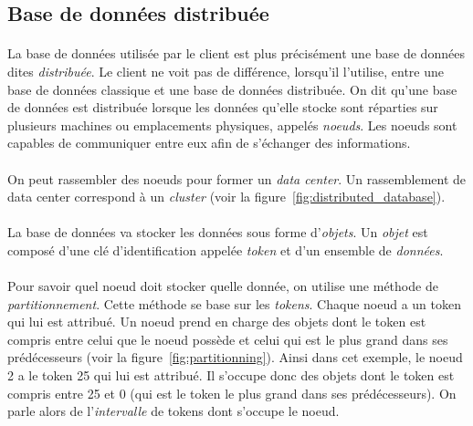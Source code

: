 \documentclass[12pt]{article}
\begin{document}

\subsection{Base de données distribuée}

\paragraph{} La base de données utilisée par le client est plus précisément une base de données dites \textit{distribuée}. Le client ne voit pas de différence, lorsqu'il l'utilise, entre une base de données classique et une base de données distribuée. On dit qu'une base de données est distribuée lorsque les données qu'elle stocke sont réparties sur plusieurs machines ou emplacements physiques, appelés \textit{noeuds}. Les noeuds sont capables de communiquer entre eux afin de s'échanger des informations.

\paragraph{} On peut rassembler des noeuds pour former un \textit{data center}. Un rassemblement de data center correspond à un \textit{cluster} (voir la figure~\ref{fig:distributed_database}).

\paragraph{} La base de données va stocker les données sous forme d'\textit{objets}. Un \textit{objet} est composé d'une clé d'identification appelée \textit{token} et d'un ensemble de \textit{données}.

\paragraph{} Pour savoir quel noeud doit stocker quelle donnée, on utilise une méthode de \textit{partitionnement}. Cette méthode se base sur les \textit{tokens}. Chaque noeud a un token qui lui est attribué. Un noeud prend en charge des objets dont le token est compris entre celui que le noeud possède et celui qui est le plus grand dans ses prédécesseurs (voir la figure~\ref{fig:partitionning}). Ainsi dans cet exemple, le noeud 2 a le token 25 qui lui est attribué. Il s'occupe donc des objets dont le token est compris entre 25 et 0 (qui est le token le plus grand dans ses prédécesseurs). On parle alors de l'\textit{intervalle} de tokens dont s'occupe le noeud.
\end{document}
